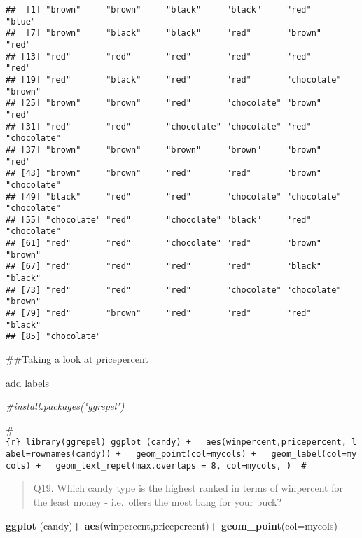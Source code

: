 \documentclass[
]{article}
\newenvironment{Shaded}{\begin{snugshade}}{\end{snugshade}}
\newcommand{\AttributeTok}[1]{\textcolor[rgb]{0.13,0.29,0.53}{#1}}
\newcommand{\CommentTok}[1]{\textcolor[rgb]{0.56,0.35,0.01}{\textit{#1}}}
\newcommand{\FunctionTok}[1]{\textcolor[rgb]{0.13,0.29,0.53}{\textbf{#1}}}
\newcommand{\NormalTok}[1]{#1}
\newcommand{\SpecialCharTok}[1]{\textcolor[rgb]{0.81,0.36,0.00}{\textbf{#1}}}
\begin{document}
\begin{verbatim}
##  [1] "brown"     "brown"     "black"     "black"     "red"       "blue"     
##  [7] "brown"     "black"     "black"     "red"       "brown"     "red"      
## [13] "red"       "red"       "red"       "red"       "red"       "red"      
## [19] "red"       "black"     "red"       "red"       "chocolate" "brown"    
## [25] "brown"     "brown"     "red"       "chocolate" "brown"     "red"      
## [31] "red"       "red"       "chocolate" "chocolate" "red"       "chocolate"
## [37] "brown"     "brown"     "brown"     "brown"     "brown"     "red"      
## [43] "brown"     "brown"     "red"       "red"       "brown"     "chocolate"
## [49] "black"     "red"       "red"       "chocolate" "chocolate" "chocolate"
## [55] "chocolate" "red"       "chocolate" "black"     "red"       "chocolate"
## [61] "red"       "red"       "chocolate" "red"       "brown"     "brown"    
## [67] "red"       "red"       "red"       "red"       "black"     "black"    
## [73] "red"       "red"       "red"       "chocolate" "chocolate" "brown"    
## [79] "red"       "brown"     "red"       "red"       "red"       "black"    
## [85] "chocolate"
\end{verbatim}

\#\#Taking a look at pricepercent

add labels

\begin{Shaded}
\begin{Highlighting}[]
\CommentTok{\#install.packages("ggrepel")}
\end{Highlighting}
\end{Shaded}

\#\texttt{\{r\}\ library(ggrepel)\ ggplot\ (candy)\ +\ \ \ aes(winpercent,pricepercent,\ label=rownames(candy))\ +\ \ \ geom\_point(col=mycols)\ +\ \ \ geom\_label(col=mycols)\ +\ \ \ geom\_text\_repel(max.overlaps\ =\ 8,\ col=mycols,\ )\ \ \#}

\begin{quote}
Q19. Which candy type is the highest ranked in terms of winpercent for
the least money - i.e.~offers the most bang for your buck?
\end{quote}

\begin{Shaded}
\begin{Highlighting}[]
\FunctionTok{ggplot}\NormalTok{ (candy)}\SpecialCharTok{+}
  \FunctionTok{aes}\NormalTok{(winpercent,pricepercent)}\SpecialCharTok{+}
  \FunctionTok{geom\_point}\NormalTok{(}\AttributeTok{col=}\NormalTok{mycols)}
\end{Highlighting}
\end{Shaded}
\end{document}
